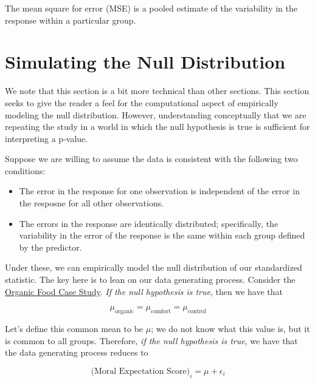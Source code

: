 \documentclass[
]{book}
\providecommand{\tightlist}{%
  \setlength{\itemsep}{0pt}\setlength{\parskip}{0pt}}
\theoremstyle{plain}
\theoremstyle{mydefn}
\theoremstyle{myexmpl}
\theoremstyle{remark}
\begin{document}
\begin{rmdtip}
The mean square for error (MSE) is a pooled estimate of the variability in the response within a particular group.
\end{rmdtip}

\hypertarget{simulating-the-null-distribution}{%
\section{Simulating the Null Distribution}\label{simulating-the-null-distribution}}

We note that this section is a bit more technical than other sections. This section seeks to give the reader a feel for the computational aspect of empirically modeling the null distribution. However, understanding conceptually that we are repeating the study in a world in which the null hypothesis is true is sufficient for interpreting a p-value.

Suppose we are willing to assume the data is consistent with the following two conditions:

\begin{itemize}
\tightlist
\item
  The error in the response for one observation is independent of the error in the resposne for all other observations.\\
\item
  The errors in the response are identically distributed; specifically, the variability in the error of the response is the same within each group defined by the predictor.
\end{itemize}

Under these, we can empirically model the null distribution of our standardized statistic. The key here is to lean on our data generating process. Consider the \protect\hyperlink{CaseOrganic}{Organic Food Case Study}. \emph{If the null hypothesis is true}, then we have that

\[\mu_{\text{organic}} = \mu_{\text{comfort}} = \mu_{\text{control}}\]

Let's define this common mean to be \(\mu\); we do not know what this value is, but it is common to all groups. Therefore, \emph{if the null hypothesis is true}, we have that the data generating process reduces to

\begin{equation}
  \text{(Moral Expectation Score)}_i = \mu + \epsilon_i
  \label{eq:null-model}
\end{equation}
\end{document}
